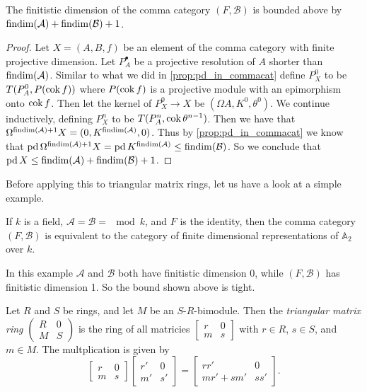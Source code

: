 \begin{theorem}\cite[Theorem~4.20]{FGR75}\label{thm:findim_of_comma_cat}
	The finitistic dimension of the comma category $(F, \mathcal B)$ is bounded above by $\operatorname{findim}(\mathcal A) + \operatorname{findim}(\mathcal B) + 1$.
	\begin{proof}
		Let $X=(A, B, f)$ be an element of the comma category with finite projective dimension. Let $P_A^\bullet$ be a projective resolution of $A$ shorter than $\operatorname{findim}(\mathcal A)$. Similar to what we did in \cref{prop:pd_in_commacat} define $P_X^0$ to be $T(P_A^0, P(\operatorname{cok} f))$ where $P(\operatorname{cok} f)$ is a projective module with an epimorphism onto $\operatorname{cok} f$. Then let the kernel of $P_X^0 \to X$ be $(\Omega A, K^0, \theta^0)$. We continue inductively, defining $P_X^n$ to be $T(P_A^n, \operatorname{cok} \theta^{n-1})$. Then we have that $\Omega^{\operatorname{findim}(\mathcal A)+1} X = (0, K^{\operatorname{findim}(\mathcal A)}, 0)$. Thus by \cref{prop:pd_in_commacat} we know that $\operatorname{pd}\Omega^{\operatorname{findim}(\mathcal A)+1}X = \operatorname{pd} K^{\operatorname{findim}(\mathcal A)} \leq \operatorname{findim}(\mathcal B)$. So we conclude that $\operatorname{pd} X \leq \operatorname{findim}(\mathcal A) + \operatorname{findim}(\mathcal B) + 1$.
	\end{proof}
\end{theorem}

Before applying this to triangular matrix rings, let us have a look at a simple example.

\begin{example}\label{ex:triangular_matrix_ring}
	If $k$ is a field, $\mathcal A = \mathcal B = \mod k$, and $F$ is the identity, then the comma category $(F, \mathcal B)$ is equivalent to the category of finite dimensional representations of $\mathbb A_2$ over $k$. 
\end{example}

In this example $\mathcal A$ and $\mathcal B$ both have finitistic dimension 0, while $(F, \mathcal B)$ has finitistic dimension 1. So the bound shown above is tight. 

\begin{defn}
	Let $R$ and $S$ be rings, and let $M$ be an $S$-$R$-bimodule. Then the \emph{triangular matrix ring} $\begin{pmatrix}
	R & 0\\
	M & S
	\end{pmatrix}$ is the ring of all matricies $\begin{bmatrix}
	r & 0\\
	m & s
	\end{bmatrix}$ with $r\in R$, $s\in S$, and $m\in M$. The multplication is given by
	$$\begin{bmatrix}
	r & 0\\
	m & s
	\end{bmatrix}\begin{bmatrix}
	r' & 0\\
	m' & s'
	\end{bmatrix}=\begin{bmatrix}
	rr' & 0\\
	mr' + sm' & ss'
	\end{bmatrix}.$$
\end{defn}

